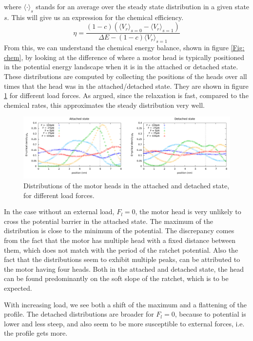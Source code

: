 \documentclass[aps,pre,onecolumn,showpacs,showkeys,a4paper]{revtex4}
\begin{document}
where $\langle \cdot \rangle_{s}$ stands for an average over the steady state distribution in a given state $s$. This will give us an expression for the chemical efficiency.
\begin{equation}
\eta = \frac{(1-c)\left(\langle V_r\rangle_{s=0}-\langle V_r\rangle_{s=1}\right)}{\Delta E - (1-c)\langle V_r\rangle_{s=1}}\label{eta}
\end{equation}
From this, we can understand the chemical energy balance, shown in figure \ref{Fig: chem}, by looking at the difference of where a motor head is typically positioned in the potential energy landscape when it is in the attached or detached state. These distributions are computed by collecting the positions of the heads over all times that the head was in the attached/detached state. They are shown in figure \ref{Fig: pos_distr} for different load forces. As argued, since the relaxation is fast, compared to the chemical rates, this approximates the steady distribution very well.
\begin{figure}[h]
\centering
\includegraphics[width=1\textwidth,height=!]{pos_distr_all_F}
\caption{Distributions of the motor heads in the attached and detached state, for different load forces.}
\label{Fig: pos_distr}
\end{figure}
In the case without an external load, $F_l=0$, the motor head is very unlikely to cross the potential barrier in the attached state. The maximum of the distribution is close to the minimum of the potential. The discrepancy comes from the fact that the motor has multiple head with a fixed distance between them, which does not match with the period of the ratchet potential. Also the fact that the distributions seem to exhibit multiple peaks, can be attributed to the motor having four heads. Both in the attached and detached state, the head can be found predominantly on the soft slope of the ratchet, which is to be expected.\par
With increasing load, we see both a shift of the maximum and a flattening of the profile. The detached distributions are broader for $F_l=0$, because to potential is lower and less steep, and also seem to be more susceptible to external forces, i.e. the profile gets more. \par
\end{document}
